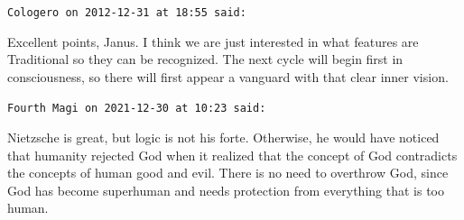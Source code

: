 \begin{footnotesize}
\begin{sffamily}
\hfill

\texttt{Cologero on 2012-12-31 at 18:55 said: }

Excellent points, Janus. I think we are just interested in what features are Traditional so they can be recognized. The next cycle will begin first in consciousness, so there will first appear a vanguard with that clear inner vision.


\hfill

\texttt{Fourth Magi on 2021-12-30 at 10:23 said: }

Nietzsche is great, but logic is not his forte. Otherwise, he would have noticed that humanity rejected God when it realized that the concept of God contradicts the concepts of human good and evil. There is no need to overthrow God, since God has become superhuman and needs protection from everything that is too human.


\end{sffamily}\end{footnotesize}

